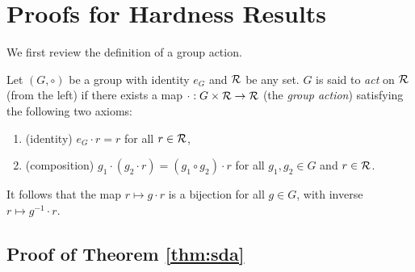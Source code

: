 \section{Proofs for Hardness Results}\label{app:hard}

We first review the definition of a group action.

\begin{defn}\label{def:group}
Let $(G,\circ)$ be a group with identity $e_G$ and $\mathcal{R}$ be any set. $G$ is said to \emph{act} on $\mathcal{R}$ (from the left) if there exists a map $\cdot:G\times\mathcal{R}\to\mathcal{R}$ (the \emph{group action}) satisfying the following two axioms:
\begin{enumerate}
    \item (identity) $e_G\cdot r=r$ for all $r\in\mathcal{R}$,
    \item (composition) $g_1\cdot(g_2\cdot r) = (g_1\circ g_2)\cdot r$ for all $g_1,g_2\in G$ and $r\in\mathcal{R}$.
\end{enumerate}
It follows that the map $r\mapsto g\cdot r$ is a bijection for all $g\in G$, with inverse $r\mapsto g^{-1}\cdot r$.
\end{defn}


\subsection{Proof of Theorem \ref{thm:sda}}



